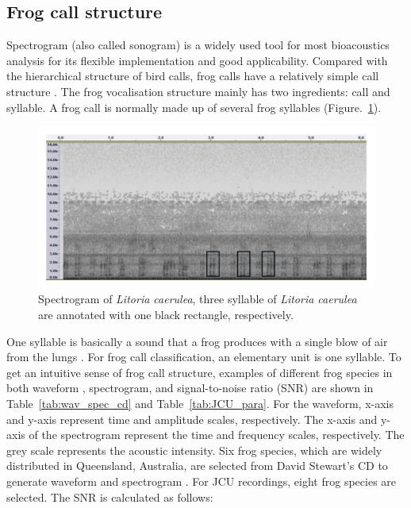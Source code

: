 \subsection{Frog call structure}
Spectrogram (also called sonogram) is a widely used tool for most bioacoustics analysis for its flexible implementation and good applicability. Compared with the hierarchical structure of bird calls, frog calls have a relatively simple call structure \citep{somervuo2006parametric}. The frog vocalisation structure mainly has two ingredients: call and syllable. A frog call is normally made up of several frog syllables (Figure.~\ref{fig:Ch1_spec_mark}).

\begin{figure}[htb!]
\centering
\includegraphics[width=\textwidth]{image/Ch1/spectrogram_mark.pdf}
\caption[Spectrogram of \textit{Litoria caerulea}]{Spectrogram of \textit{Litoria caerulea}, three syllable of \textit{Litoria caerulea} are annotated with one black rectangle, respectively.}
\label{fig:Ch1_spec_mark}
\end{figure}




One syllable is basically a sound that a frog produces with a single blow of air from the lungs \citep{huang2009frog}. For frog call classification, an elementary unit is one syllable. To get an intuitive sense of frog call structure, examples of different frog species in both waveform , spectrogram, and signal-to-noise ratio (SNR) are shown in Table~\ref{tab:wav_spec_cd} and Table~\ref{tab:JCU_para}. For the waveform, x-axis and y-axis represent time and amplitude scales, respectively. The x-axis and y-axis of the spectrogram represent the time and frequency scales, respectively. The grey scale represents the acoustic intensity. Six frog species, which are widely distributed in Queensland, Australia, are selected from David Stewart's CD to generate waveform and spectrogram \citep{CD}. For JCU recordings, eight frog species are selected. The SNR is calculated as follows:

